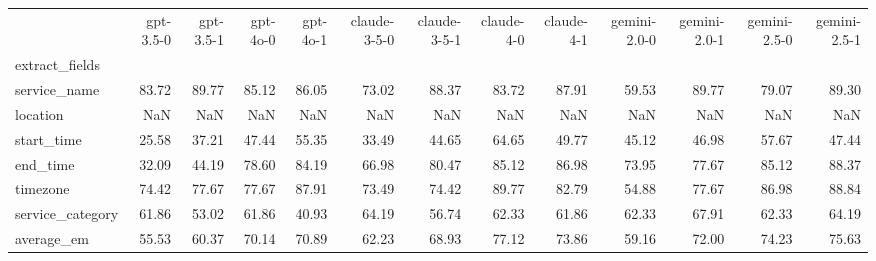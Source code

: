 \begin{tabular}{lrrrrrrrrrrrr}
\toprule
 & gpt-3.5-0 & gpt-3.5-1 & gpt-4o-0 & gpt-4o-1 & claude-3-5-0 & claude-3-5-1 & claude-4-0 & claude-4-1 & gemini-2.0-0 & gemini-2.0-1 & gemini-2.5-0 & gemini-2.5-1 \\
extract_fields &  &  &  &  &  &  &  &  &  &  &  &  \\
\midrule
service_name & 83.72 & 89.77 & 85.12 & 86.05 & 73.02 & 88.37 & 83.72 & 87.91 & 59.53 & 89.77 & 79.07 & 89.30 \\
location & NaN & NaN & NaN & NaN & NaN & NaN & NaN & NaN & NaN & NaN & NaN & NaN \\
start_time & 25.58 & 37.21 & 47.44 & 55.35 & 33.49 & 44.65 & 64.65 & 49.77 & 45.12 & 46.98 & 57.67 & 47.44 \\
end_time & 32.09 & 44.19 & 78.60 & 84.19 & 66.98 & 80.47 & 85.12 & 86.98 & 73.95 & 77.67 & 85.12 & 88.37 \\
timezone & 74.42 & 77.67 & 77.67 & 87.91 & 73.49 & 74.42 & 89.77 & 82.79 & 54.88 & 77.67 & 86.98 & 88.84 \\
service_category & 61.86 & 53.02 & 61.86 & 40.93 & 64.19 & 56.74 & 62.33 & 61.86 & 62.33 & 67.91 & 62.33 & 64.19 \\
average_em & 55.53 & 60.37 & 70.14 & 70.89 & 62.23 & 68.93 & 77.12 & 73.86 & 59.16 & 72.00 & 74.23 & 75.63 \\
\bottomrule
\end{tabular}
